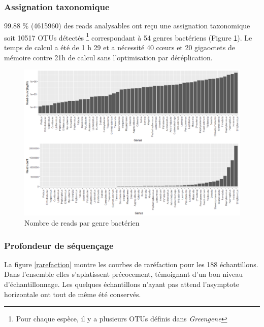 \documentclass[12pt,a4paper]{article}
\begin{document}
\subsubsection{Assignation taxonomique}
99.88 \% (4615960) des reads analysables ont reçu une assignation taxonomique soit 10517 OTUs détectés \footnote{Pour chaque espèce, il y a plusieurs OTUs définis dans \textit{Greengene}} correspondant à 54 genres bactériens (Figure \ref{readgenus}).
Le temps de calcul a été de 1 h 29 et a nécessité 40 cœurs et 20 gigaoctets de mémoire contre 21h de calcul sans l’optimisation par déréplication.


\begin{figure}[h]
\begin{center}
\includegraphics[scale=0.5]{img/read_count_genus_all.png}\hfill
\end{center}
\caption{Nombre de reads par genre bactérien}
\label{readgenus}
\end{figure}


\subsubsection{Profondeur de séquençage}
La figure \ref{rarefaction} montre les courbes de raréfaction pour les 188 échantillons.
Dans l'ensemble elles s’aplatissent précocement, témoignant d’un bon niveau d'échantillonnage. Les quelques échantillons n'ayant pas attend l'asymptote horizontale ont tout de même été conservés.
\end{document}
